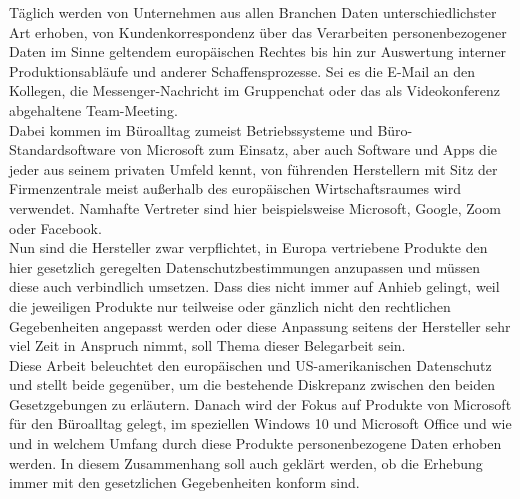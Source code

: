 Täglich werden von Unternehmen aus allen Branchen Daten unterschiedlichster Art erhoben, von Kundenkorrespondenz über das Verarbeiten personenbezogener Daten im Sinne geltendem europäischen Rechtes bis hin zur Auswertung interner Produktionsabläufe und anderer Schaffensprozesse. Sei es die E-Mail an den Kollegen, die Messenger-Nachricht im Gruppenchat oder das als Videokonferenz abgehaltene Team-Meeting.\\
Dabei kommen im Büroalltag zumeist Betriebssysteme und Büro-Standardsoftware von Microsoft zum Einsatz, aber auch Software und Apps die jeder aus seinem privaten Umfeld kennt, von führenden Herstellern mit Sitz der Firmenzentrale meist außerhalb des europäischen Wirtschaftsraumes wird verwendet. Namhafte Vertreter sind hier beispielsweise Microsoft, Google, Zoom oder Facebook.\\
Nun sind die Hersteller zwar verpflichtet, in Europa vertriebene Produkte den hier gesetzlich geregelten Datenschutzbestimmungen anzupassen und müssen diese auch verbindlich umsetzen. Dass dies nicht immer auf Anhieb gelingt, weil die jeweiligen Produkte nur teilweise oder gänzlich nicht den rechtlichen Gegebenheiten angepasst werden oder diese Anpassung seitens der Hersteller sehr viel Zeit in Anspruch nimmt, soll Thema dieser Belegarbeit sein.\\
Diese Arbeit beleuchtet den europäischen und US-amerikanischen Datenschutz und stellt beide gegenüber, um die bestehende Diskrepanz zwischen den beiden Gesetzgebungen zu erläutern. Danach wird der Fokus auf Produkte von Microsoft für den Büroalltag gelegt, im speziellen Windows 10 und Microsoft Office und wie und in welchem Umfang durch diese Produkte personenbezogene Daten erhoben werden. In diesem Zusammenhang soll auch geklärt werden, ob die Erhebung immer mit den gesetzlichen Gegebenheiten konform sind.
